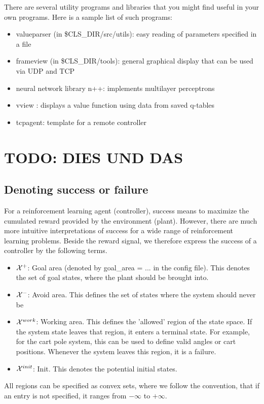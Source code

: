 \documentclass[a4paper,12pt,german]{article}
\newcommand{\clsdir}{{\$CLS\_DIR}}
\newcommand{\Xplus}{{${\cal X}^+$}}
\newcommand{\Xminus}{{${\cal X}^-$}}
\newcommand{\Xwork}{{${\cal X}^{work}$}}
\newcommand{\Xinit}{{${\cal X}^{init}$}}
\newcommand{\ite}{\begin{itemize}}
\newcommand{\eti}{\end{itemize}}
\begin{document}
There are several utility programs and libraries that you might find useful in your own programs.
Here is a sample list of such programs:

\ite
\item valueparser (in \clsdir/src/utils): easy reading of parameters specified in a file
\item frameview (in \clsdir/tools): general graphical display that can be used via UDP and TCP
\item neural network library n++: implements multilayer perceptrons 
\item vview : displays a value function using data from saved q-tables
\item tcpagent: template for a remote controller
\eti

\section{TODO: DIES UND DAS}

\subsection{Denoting success or failure}
For a reinforcement learning agent (controller), success means to
maximize the cumulated reward provided by the environment (plant).
However, there are much more intuitive interpretations of success for
a wide range of reinforcement learning problems. Beside the reward
signal, we therefore express the success of a controller by the
following terms.

\ite
\item \Xplus: Goal area (denoted by goal\_area = ... in the config file). This denotes the set of goal
states, where the plant should be brought into.
\item \Xminus: Avoid area. This defines the set of states where the system should never be
\item \Xwork: Working area. This defines the 'allowed' region of the state space. If the system state leaves 
  that region, it enters a terminal state. For example, for the cart pole system, this can be used to define valid angles or 
  cart positions. Whenever the system leaves this region, it is a failure. 
\item \Xinit: Init. This denotes the potential initial states.
\eti

All regions can be specified as convex sets, where we follow the convention, that if an entry is not
specified, it ranges from $-\infty$  to $+\infty$.
\end{document}
